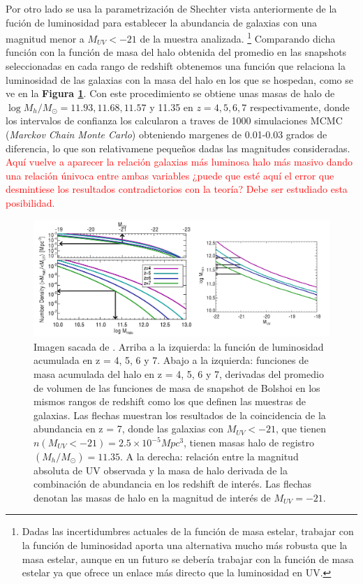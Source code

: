 \documentclass{article}
\begin{document}
Por otro lado se usa la parametrización de Shechter vista anteriormente de la fución de luminosidad para establecer la abundancia de galaxias con una magnitud menor a $M_{UV}<-21$ de la muestra analizada. \footnote{Dadas las incertidumbres actuales de la función de masa estelar, trabajar con la función de luminosidad aporta una alternativa mucho más robusta que la masa estelar, aunque en un futuro se debería trabajar con la función de masa estelar ya que ofrece un enlace más directo que la luminosidad en UV.} Comparando dicha función con la función de masa del halo obtenida del promedio en las snapshots seleccionadas en cada rango de redshift obtenemos una función que relaciona la luminosidad de las galaxias con la masa del halo en los que se hospedan, como se ve en la \textbf{Figura \ref{fig:fink1}}. Con este procedimiento se obtiene unas masas de halo de $\log M_h/M_\odot= 11.93, 11.68, 11.57$ y 11.35 en $z=4,5,6,7$ respectivamente, donde los intervalos de confianza los calcularon a traves de 1000 simulaciones MCMC (\textit{Marckov Chain Monte Carlo}) obteniendo margenes de 0.01-0.03 grados de diferencia, lo que son relativamene pequeños dadas las magnitudes consideradas. \textcolor{red}{Aquí vuelve a aparecer la relación galaxias más luminosa halo más masivo dando una relación únivoca entre ambas variables ¿puede que esté aquí el error que desmintiese los resultados contradictorios con la teoría? Debe ser estudiado esta posibilidad.}\\
\begin{figure}[t]
    \centering
    \includegraphics[scale=0.5]{Figuras/fink_1.PNG}
    \caption{Imagen sacada de \cite{finkelstein2015increasing}. Arriba a la izquierda: la función de luminosidad acumulada en z = 4, 5, 6 y 7. Abajo a la izquierda: funciones de masa acumulada del halo en z = 4, 5, 6 y 7, derivadas del promedio de volumen de las funciones de masa de snapshot de Bolshoi en los mismos rangos de redshift como los que definen las muestras de galaxias. Las flechas muestran los resultados de la coincidencia de la abundancia  en z = 7, donde las galaxias con $M_{UV} <-21$, que tienen $n(M_{UV} <-21) = 2.5 \times 10^{-5}Mpc^3$, tienen masas halo de registro $(M_h / M_\odot) = 11.35$. A la derecha: relación entre la magnitud absoluta de UV observada y la masa de halo derivada de la combinación de abundancia en los redshift de interés. Las flechas denotan las masas de halo en la magnitud de interés de $M_{UV} = - 21$.}
    \label{fig:fink1}
\end{figure}
\end{document}
